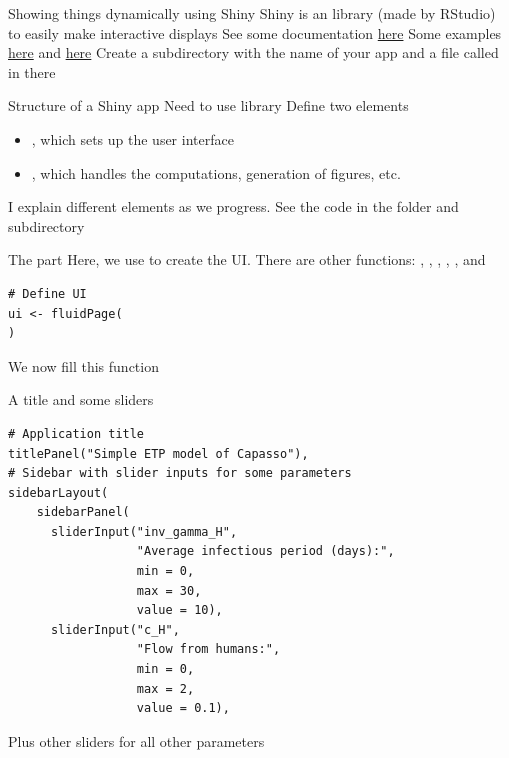 \documentclass[aspectratio=169]{beamer}
\begin{document}
\begin{frame}{Showing things dynamically using Shiny}
  Shiny is an  library (made by RStudio) to easily make interactive displays
  \vfill
  See some documentation \href{https://shiny.rstudio.com/}{here}
  \vfill
  Some examples \href{https://shiny.rstudio.com/gallery/}{here} and \href{https://github.com/rstudio/shiny-examples}{here}
  \vfill
  Create a subdirectory with the name of your app and a file called  in there
\end{frame}


\begin{frame}{Structure of a Shiny app}
  Need to use library 
  \vfill
  Define two elements
  \begin{itemize}
    \item {}, which sets up the user interface
    \item {}, which handles the computations, generation of figures, etc.
  \end{itemize}
  \vfill
  I explain different elements as we progress. See the code in the  folder and  subdirectory
\end{frame}


\begin{frame}[fragile]{The  part}
Here, we use  to create the UI. There are other functions: , , , , ,  and 
\vfill
\begin{lstlisting}
# Define UI
ui <- fluidPage(
)  
\end{lstlisting}
\vfill
We now fill this function
\end{frame}

\begin{frame}[fragile]{A title and some sliders}
\begin{lstlisting}
# Application title
titlePanel("Simple ETP model of Capasso"),
# Sidebar with slider inputs for some parameters
sidebarLayout(
    sidebarPanel(
      sliderInput("inv_gamma_H",
                  "Average infectious period (days):",
                  min = 0,
                  max = 30,
                  value = 10),
      sliderInput("c_H",
                  "Flow from humans:",
                  min = 0,
                  max = 2,
                  value = 0.1),
\end{lstlisting}
\vfill
Plus other sliders for all other parameters
\end{frame}
\end{document}
